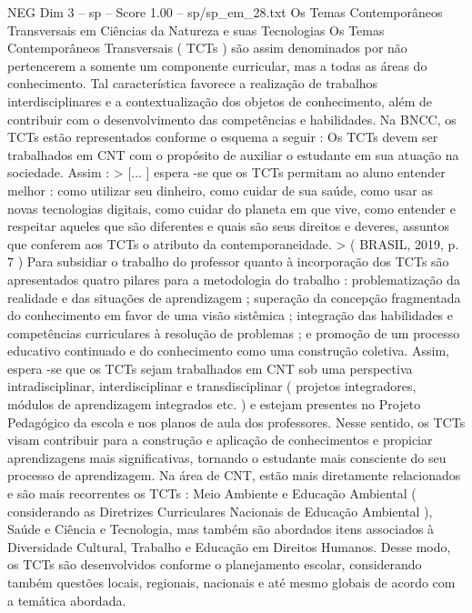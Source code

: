 \begin{textsample}{NEG Dim 3 – sp – Score 1.00 – sp/sp\_em\_28.txt}  \label{ex:f3_neg_083}
Os Temas Contemporâneos Transversais em Ciências da Natureza e suas Tecnologias Os Temas Contemporâneos Transversais ( TCTs ) são assim denominados por não pertencerem a somente um componente curricular, mas a todas as áreas do conhecimento.
Tal característica favorece a realização de trabalhos interdisciplinares e a contextualização dos objetos de conhecimento, além de contribuir com o desenvolvimento das competências e habilidades.
Na BNCC, os TCTs estão representados conforme o esquema a seguir : Os TCTs devem ser trabalhados em CNT com o propósito de auxiliar o estudante em sua atuação na sociedade.
Assim : > [... ] espera -se que os TCTs permitam ao aluno entender melhor : como utilizar seu dinheiro, como cuidar de sua saúde, como usar as novas tecnologias digitais, como cuidar do planeta em que vive, como entender e respeitar aqueles que são diferentes e quais são seus direitos e deveres, assuntos que conferem aos TCTs o atributo da contemporaneidade. > ( BRASIL, 2019, p. 7 ) Para subsidiar o trabalho do professor quanto à incorporação dos TCTs são apresentados quatro pilares para a metodologia do trabalho : problematização da realidade e das situações de aprendizagem ; superação da concepção fragmentada do conhecimento em favor de uma visão sistêmica ; integração das habilidades e competências curriculares à resolução de problemas ; e promoção de um processo educativo continuado e do conhecimento como uma construção coletiva.
Assim, espera -se que os TCTs sejam trabalhados em CNT sob uma perspectiva intradisciplinar, interdisciplinar e transdisciplinar ( projetos integradores, módulos de aprendizagem integrados etc. ) e estejam presentes no Projeto Pedagógico da escola e nos planos de aula dos professores.
Nesse sentido, os TCTs visam contribuir para a construção e aplicação de conhecimentos e propiciar aprendizagens mais significativas, tornando o estudante mais consciente do seu processo de aprendizagem.
Na área de CNT, estão mais diretamente relacionados e são mais recorrentes os TCTs : Meio Ambiente e Educação Ambiental ( considerando as Diretrizes Curriculares Nacionais de Educação Ambiental ), Saúde e Ciência e Tecnologia, mas também são abordados itens associados à Diversidade Cultural, Trabalho e Educação em Direitos Humanos.
Desse modo, os TCTs são desenvolvidos conforme o planejamento escolar, considerando também questões locais, regionais, nacionais e até mesmo globais de acordo com a temática abordada.

\end{textsample}
